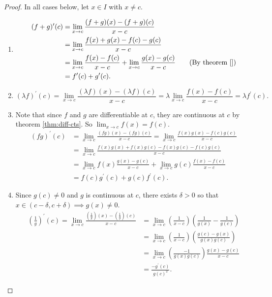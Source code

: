 \documentclass[../real_analysis.tex]{subfiles}
\begin{document}
            \begin{proof}
                In all cases below, let $x\in I$ with $x\neq c$.
                \begin{enumerate}[label={\upshape(\roman*)}]
                    \item
                    \begin{align}
                        (f+g)^\prime(c)&=\lim_{x\to c}\frac{(f+g)(x)-(f+g)(c)}{x-c}\\
                        &=\lim_{x\to c}\frac{f(x)+g(x)-f(c)-g(c)}{x-c}\\
                        &=\lim_{x\to c}\frac{f(x)-f(c)}{x-c}+\lim_{x\to c}\frac{g(x)-g(c)}{x-c}\tag{By theorem \ref{}}\\ %
                        &=f^\prime(c)+g^\prime(c).
                    \end{align}
                    \item
                    \begin{equation}
                        (\lambda f)^\prime(c)=\lim_{x\to c}\frac{(\lambda f)(x)-(\lambda f)(c)}{x-c}=\lambda\lim_{x\to c}\frac{f(x)-f(c)}{x-c}=\lambda f^\prime(c).
                    \end{equation}
                    \item Note that since $f$ and $g$ are differentiable at $c$, they are continuous at $c$ by theorem \ref{thm:diff-cts}. So $\lim_{x\to c}f(x)=f(c)$.
                    \begin{align}
                        (fg)^\prime(c)&=\lim_{x\to c}\frac{(fg)(x)-(fg)(c)}{x-c}=\lim_{x\to c}\frac{f(x)g(x)-f(c)g(c)}{x-c}\\
                        &=\lim_{x\to c}\frac{f(x)g(x)+f(x)g(c)-f(x)g(c)-f(c)g(c)}{x-c}\\
                        &=\lim_{x\to c}f(x)\frac{g(x)-g(c)}{x-c}+\lim_{x\to c}g(c)\frac{f(x)-f(c)}{x-c}\\
                        &=f(c)g^\prime(c)+g(c)f^\prime(c).
                    \end{align}
                    \item Since $g(c)\neq0$ and $g$ is continuous at $c$, there exists $\delta>0$ so that $x\in(c-\delta,c+\delta)\implies g(x)\neq0$.
                    \begin{align}
                        \left(\frac{1}{g}\right)^\prime(c)=\lim_{x\to c}\frac{\left(\frac{1}{g}\right)(x)-\left(\frac{1}{g}\right)(c)}{x-c}&=\lim_{x\to c}\left(\frac{1}{x-c}\right)\left(\frac{1}{g(x)}-\frac{1}{g(c)}\right)\\
                        &=\lim_{x\to c}\left(\frac{1}{x-c}\right)\left(\frac{g(c)-g(x)}{g(x)g(c)}\right)\\
                        &=\lim_{x\to c}\left(\frac{-1}{g(x)g(c)}\right)\frac{g(x)-g(c)}{x-c}\\
                        &=\frac{-g^\prime(c)}{g(c)^2}.
                    \end{align}
                \end{enumerate}
            \end{proof}
\end{document}
